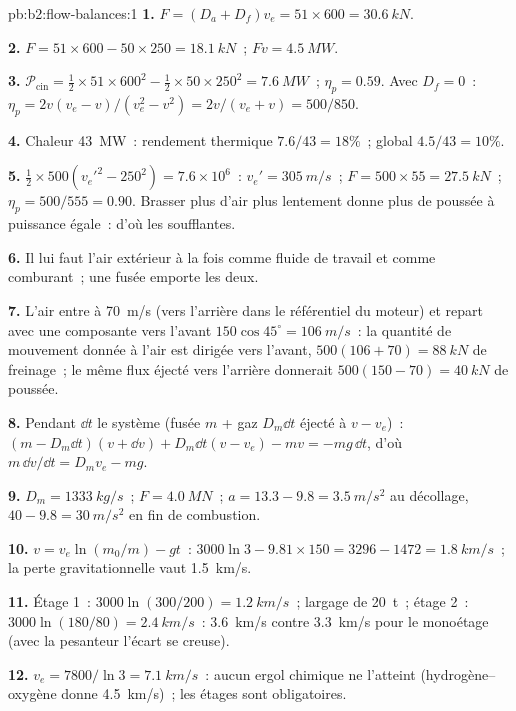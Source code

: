 \begin{solution}{pb:b2:flow-balances:1}
\textbf{1.} $F = (D_a + D_f)v_e = 51 \times 600 = \qty{30.6}{kN}$.

\textbf{2.} $F = 51 \times 600 - 50 \times 250 = \qty{18.1}{kN}$~; $Fv = \qty{4.5}{MW}$.

\textbf{3.} $\mathcal P_{\text{cin}} = \tfrac12 \times 51 \times 600^2 - \tfrac12 \times 50 \times 250^2 =
\qty{7.6}{MW}$~; $\eta_p = 0.59$. Avec $D_f = 0$~: $\eta_p = 2v(v_e - v)/(v_e^2 - v^2)
= 2v/(v_e + v) = 500/850$.

\textbf{4.} Chaleur \qty{43}{MW}~: rendement thermique $7.6/43 = 18\%$~; global $4.5/43 = 10\%$.

\textbf{5.} $\tfrac12 \times 500(v_e'^2 - 250^2) = 7.6 \times 10^6$~: $v_e' = \qty{305}{m/s}$~;
$F = 500 \times 55 = \qty{27.5}{kN}$~; $\eta_p = 500/555 = 0.90$. Brasser plus d'air plus
lentement donne plus de poussée à puissance égale~: d'où les soufflantes.

\textbf{6.} Il lui faut l'air extérieur à la fois comme fluide de travail et comme
comburant~; une fusée emporte les deux.

\textbf{7.} L'air entre à \qty{70}{m/s} (vers l'arrière dans le référentiel du moteur)
et repart avec une composante vers l'avant $150\cos45^\circ = \qty{106}{m/s}$~: la
quantité de mouvement donnée à l'air est dirigée vers l'avant, $500(106 + 70) = \qty{88}{kN}$ de
freinage~; le même flux éjecté vers l'arrière donnerait $500(150 - 70) =
\qty{40}{kN}$ de poussée.

\textbf{8.} Pendant $\dd t$ le système (fusée $m$ + gaz $D_m\dd t$ éjecté à
$v - v_e$)~: $(m - D_m\dd t)(v + \dd v) + D_m\dd t(v - v_e) - mv = -mg\,\dd t$,
d'où $m\,\dd v/\dd t = D_mv_e - mg$.

\textbf{9.} $D_m = \qty{1333}{kg/s}$~; $F = \qty{4.0}{MN}$~; $a = 13.3 - 9.8 =
\qty{3.5}{m/s^2}$ au décollage, $40 - 9.8 = \qty{30}{m/s^2}$ en fin de combustion.

\textbf{10.} $v = v_e\ln(m_0/m) - gt$~: $3000\ln3 - 9.81 \times 150 = 3296 - 1472 =
\qty{1.8}{km/s}$~; la perte gravitationnelle vaut \qty{1.5}{km/s}.

\textbf{11.} Étage 1~: $3000\ln(300/200) = \qty{1.2}{km/s}$~; largage de \qty{20}{t}~; étage
2~: $3000\ln(180/80) = \qty{2.4}{km/s}$~: \qty{3.6}{km/s} contre \qty{3.3}{km/s}
pour le monoétage (avec la pesanteur l'écart se creuse).

\textbf{12.} $v_e = 7800/\ln3 = \qty{7.1}{km/s}$~: aucun ergol chimique
ne l'atteint (hydrogène--oxygène donne \qty{4.5}{km/s})~; les étages sont obligatoires.


\end{solution}
